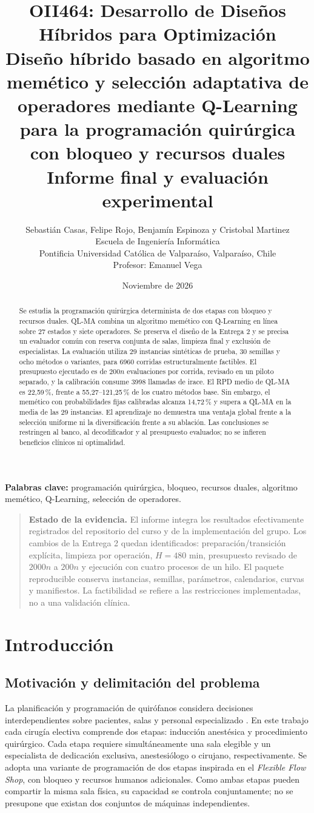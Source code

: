 \documentclass[11pt,a4paper]{article}
\title{\small OII464: Desarrollo de Diseños Híbridos para Optimización\\[7pt]
\Large Diseño híbrido basado en algoritmo memético y selección adaptativa de operadores mediante Q-Learning para la programación quirúrgica con bloqueo y recursos duales\\[5pt]
\normalsize Informe final y evaluación experimental}
\author{Sebastián Casas, Felipe Rojo, Benjamín Espinoza y Cristobal Martinez\\
\small Escuela de Ingeniería Informática\\
\small Pontificia Universidad Católica de Valparaíso, Valparaíso, Chile\\
\small Profesor: Emanuel Vega}
\date{Noviembre de 2026}
\newcommand{\nota}[1]{\begin{quote}\small\textbf{Estado de la evidencia.} #1\end{quote}}
\begin{document}
\maketitle
\begin{abstract}
Se estudia la programación quirúrgica determinista de dos etapas con bloqueo y recursos duales. QL-MA combina un algoritmo memético con Q-Learning en línea sobre 27 estados y siete operadores. Se preserva el diseño de la Entrega 2 y se precisa un evaluador común con reserva conjunta de salas, limpieza final y exclusión de especialistas. La evaluación utiliza 29 instancias sintéticas de prueba, 30 semillas y ocho métodos o variantes, para 6960 corridas estructuralmente factibles. El presupuesto ejecutado es de $200n$ evaluaciones por corrida, revisado en un piloto separado, y la calibración consume 3998 llamadas de irace. El RPD medio de QL-MA es 22,59\,\%, frente a 55,27--121,25\,\% de los cuatro métodos base. Sin embargo, el memético con probabilidades fijas calibradas alcanza 14,72\,\% y supera a QL-MA en la media de las 29 instancias. El aprendizaje no demuestra una ventaja global frente a la selección uniforme ni la diversificación frente a su ablación. Las conclusiones se restringen al banco, al decodificador y al presupuesto evaluados; no se infieren beneficios clínicos ni optimalidad.
\end{abstract}
\noindent\textbf{Palabras clave:} programación quirúrgica, bloqueo, recursos duales, algoritmo memético, Q-Learning, selección de operadores.

\nota{El informe integra los resultados efectivamente registrados del repositorio del curso y de la implementación del grupo. Los cambios de la Entrega 2 quedan identificados: preparación/transición explícita, limpieza por operación, $H=480$ min, presupuesto revisado de $2000n$ a $200n$ y ejecución con cuatro procesos de un hilo. El paquete reproducible conserva instancias, semillas, parámetros, calendarios, curvas y manifiestos. La factibilidad se refiere a las restricciones implementadas, no a una validación clínica.}

\section{Introducción}
\subsection*{Motivación y delimitación del problema}
La planificación y programación de quirófanos considera decisiones interdependientes sobre pacientes, salas y personal especializado \cite{cardoen}. En este trabajo cada cirugía electiva comprende dos etapas: inducción anestésica y procedimiento quirúrgico. Cada etapa requiere simultáneamente una sala elegible y un especialista de dedicación exclusiva, anestesiólogo o cirujano, respectivamente. Se adopta una variante de programación de dos etapas inspirada en el \emph{Flexible Flow Shop}, con bloqueo y recursos humanos adicionales. Como ambas etapas pueden compartir la misma sala física, su capacidad se controla conjuntamente; no se presupone que existan dos conjuntos de máquinas independientes.
\end{document}
